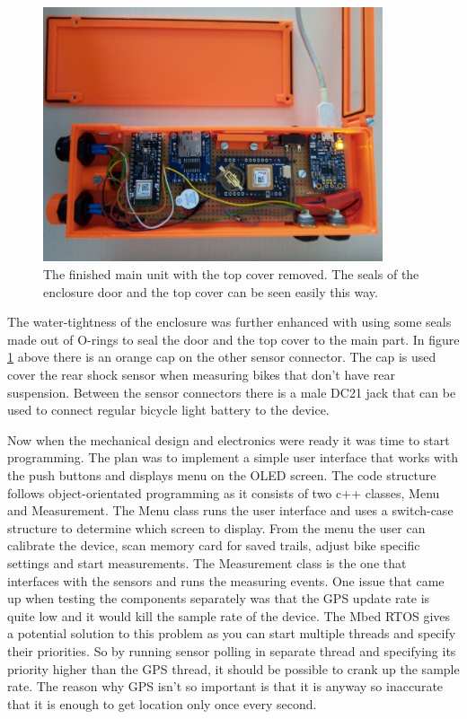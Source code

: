 \documentclass[a4paper,11pt]{article}
\begin{document}
\begin{figure}[H]
    \centering
    \includegraphics[width=100mm]{Figures/measurement_unit.jpg}
    \caption{The finished main unit with the top cover removed. The seals of the enclosure door and the top cover can be seen easily this way.}
    \label{fig:enclosure_opened}
\end{figure}

The water-tightness of the enclosure was further enhanced with using some seals made out of O-rings to seal the door and the top cover to the main part. In figure \ref{fig:enclosure_opened} above there is an orange cap on the other sensor connector. The cap is used cover the rear shock sensor when measuring bikes that don't have rear suspension. Between the sensor connectors there is a male DC21 jack that can be used to connect regular bicycle light battery to the device.

Now when the mechanical design and electronics were ready it was time to start programming. The plan was to implement a simple user interface that works with the push buttons and displays menu on the OLED screen. The code structure follows object-orientated programming as it consists of two c++ classes, Menu and Measurement. The Menu class runs the user interface and uses a switch-case structure to determine which screen to display. From the menu the user can calibrate the device, scan memory card for saved trails, adjust bike specific settings and start measurements. The Measurement class is the one that interfaces with the sensors and runs the measuring events. One issue that came up when testing the components separately was that the GPS update rate is quite low and it would kill the sample rate of the device. The Mbed RTOS gives a potential solution to this problem as you can start multiple threads and specify their priorities. So by running sensor polling in separate thread and specifying its priority higher than the GPS thread, it should be possible to crank up the sample rate. The reason why GPS isn't so important is that it is anyway so inaccurate that it is enough to get location only once every second. 
\end{document}
